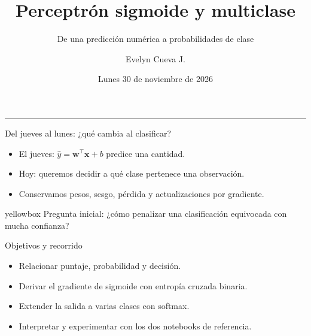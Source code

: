 \documentclass[10pt,aspectratio=169,xcolor={dvipsnames}]{beamer}
\title[Clase 13]{\bfseries Perceptrón sigmoide y multiclase}
\subtitle{De una predicción numérica a probabilidades de clase}
\author[E. Cueva]{Evelyn Cueva J.}
\institute{Aprendizaje Automático Inicial · Ciencia de Datos}
\date[30 nov. 2026]{Lunes 30 de noviembre de 2026}
\newenvironment{caja}[1][lgraybox]{\begin{beamercolorbox}[sep=0.7em,wd=\linewidth]{#1}}{\end{beamercolorbox}}
\begin{document}
\begin{frame}[plain]
    \vspace{6mm}{\small CLASE 13\par}\vspace{6mm}
    {\LARGE\bfseries\inserttitle\par}\vspace{3mm}
    {\color{fondo}\rule{0.92\textwidth}{1pt}}\par
    {\large\insertsubtitle\par}\vspace{8mm}
    \insertauthor\par\smallskip{\small\insertinstitute\par}\vspace{3mm}
    {\small\insertdate\par}\vfill
\end{frame}
\begin{frame}{Del jueves al lunes: ¿qué cambia al clasificar?}
\begin{itemize}
\item El jueves: $\hat y=\bm w^\top\bm x+b$ predice una cantidad.
\item Hoy: queremos decidir a qué clase pertenece una observación.
\item Conservamos pesos, sesgo, pérdida y actualizaciones por gradiente.
\end{itemize}\begin{caja}[yellowbox]
Pregunta inicial: ¿cómo penalizar una clasificación equivocada con mucha confianza?
\end{caja}

\note{}
\end{frame}

\begin{frame}{Objetivos y recorrido}
\begin{itemize}
\item Relacionar puntaje, probabilidad y decisión.
\item Derivar el gradiente de sigmoide con entropía cruzada binaria.
\item Extender la salida a varias clases con softmax.
\item Interpretar y experimentar con los dos notebooks de referencia.
\end{itemize}
\note{}
\end{frame}
\end{document}
